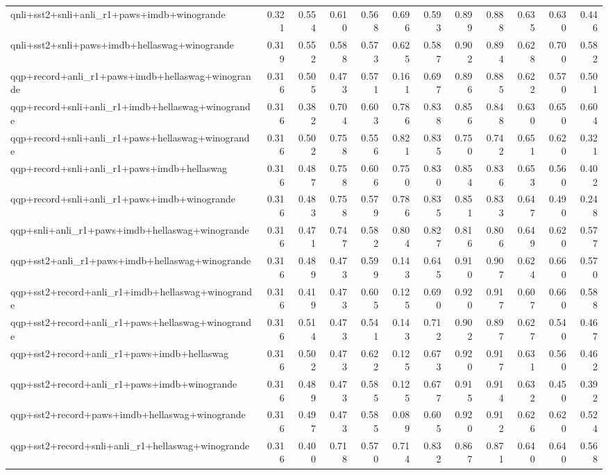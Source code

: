 \begin{table}[t]
\begin{tabular}{lrrrrrrrrrrr}
    qnli+sst2+snli+anli\_r1+paws+imdb+winogrande & 0.321 & 0.554 & 0.610 & 0.568 & 0.696 & 0.593 & 0.899 & 0.888 & 0.635 & 0.630 & 0.446 \\
    qnli+sst2+snli+paws+imdb+hellaswag+winogrande & 0.319 & 0.552 & 0.588 & 0.573 & 0.625 & 0.587 & 0.902 & 0.894 & 0.628 & 0.700 & 0.582 \\
    qqp+record+anli\_r1+paws+imdb+hellaswag+winogrande & 0.316 & 0.505 & 0.473 & 0.571 & 0.161 & 0.697 & 0.896 & 0.885 & 0.622 & 0.570 & 0.501 \\
    qqp+record+snli+anli\_r1+imdb+hellaswag+winogrande & 0.316 & 0.382 & 0.704 & 0.603 & 0.786 & 0.838 & 0.856 & 0.848 & 0.630 & 0.650 & 0.604 \\
    qqp+record+snli+anli\_r1+paws+hellaswag+winogrande & 0.316 & 0.502 & 0.758 & 0.556 & 0.821 & 0.835 & 0.750 & 0.742 & 0.651 & 0.620 & 0.321 \\
    qqp+record+snli+anli\_r1+paws+imdb+hellaswag & 0.316 & 0.487 & 0.758 & 0.606 & 0.750 & 0.830 & 0.854 & 0.836 & 0.653 & 0.560 & 0.402 \\
    qqp+record+snli+anli\_r1+paws+imdb+winogrande & 0.316 & 0.483 & 0.758 & 0.579 & 0.786 & 0.835 & 0.851 & 0.833 & 0.647 & 0.490 & 0.248 \\
    qqp+snli+anli\_r1+paws+imdb+hellaswag+winogrande & 0.316 & 0.471 & 0.747 & 0.582 & 0.804 & 0.827 & 0.816 & 0.806 & 0.649 & 0.620 & 0.577 \\
    qqp+sst2+anli\_r1+paws+imdb+hellaswag+winogrande & 0.316 & 0.489 & 0.473 & 0.599 & 0.143 & 0.645 & 0.910 & 0.907 & 0.624 & 0.660 & 0.570 \\
    qqp+sst2+record+anli\_r1+imdb+hellaswag+winogrande & 0.316 & 0.419 & 0.473 & 0.605 & 0.125 & 0.690 & 0.920 & 0.917 & 0.607 & 0.660 & 0.588 \\
    qqp+sst2+record+anli\_r1+paws+hellaswag+winogrande & 0.316 & 0.514 & 0.473 & 0.541 & 0.143 & 0.712 & 0.902 & 0.897 & 0.627 & 0.540 & 0.467 \\
    qqp+sst2+record+anli\_r1+paws+imdb+hellaswag & 0.316 & 0.502 & 0.473 & 0.622 & 0.125 & 0.673 & 0.920 & 0.917 & 0.631 & 0.560 & 0.462 \\
    qqp+sst2+record+anli\_r1+paws+imdb+winogrande & 0.316 & 0.489 & 0.473 & 0.585 & 0.125 & 0.677 & 0.915 & 0.914 & 0.632 & 0.450 & 0.392 \\
    qqp+sst2+record+paws+imdb+hellaswag+winogrande & 0.316 & 0.497 & 0.473 & 0.585 & 0.089 & 0.605 & 0.920 & 0.912 & 0.626 & 0.620 & 0.524 \\
    qqp+sst2+record+snli+anli\_r1+hellaswag+winogrande & 0.316 & 0.400 & 0.718 & 0.570 & 0.714 & 0.832 & 0.867 & 0.871 & 0.640 & 0.640 & 0.568 \\

\end{tabular}
\end{table}
